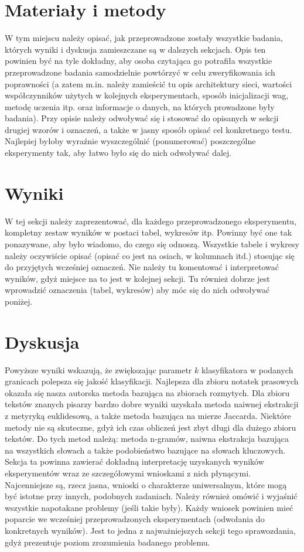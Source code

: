 \documentclass[a4paper]{classrep}
\begin{document}
\section{Materiały i metody}

{\color{blue}
W tym miejscu należy opisać, jak przeprowadzone zostały wszystkie badania,
których wyniki i dyskusja zamieszczane są w dalszych sekcjach. Opis ten
powinien być na tyle dokładny, aby osoba czytająca go potrafiła wszystkie
przeprowadzone badania samodzielnie powtórzyć w celu zweryfikowania ich
poprawności (a zatem m.in. należy zamieścić tu opis architektury sieci,
wartości współczynników użytych w kolejnych eksperymentach, sposób
inicjalizacji wag, metodę uczenia itp. oraz informacje o danych, na których
prowadzone były badania). Przy opisie należy odwoływać się i stosować do
opisanych w sekcji drugiej wzorów i oznaczeń, a także w jasny sposób opisać
cel konkretnego testu. Najlepiej byłoby wyraźnie wyszczególnić (ponumerować)
poszczególne eksperymenty tak, aby łatwo było się do nich odwoływać dalej.}

\section{Wyniki}
{\color{blue}
W tej sekcji należy zaprezentować, dla każdego przeprowadzonego eksperymentu,
kompletny zestaw wyników w postaci tabel, wykresów itp. Powinny być one tak
ponazywane, aby było wiadomo, do czego się odnoszą. Wszystkie tabele i wykresy
należy oczywiście opisać (opisać co jest na osiach, w kolumnach itd.) stosując
się do przyjętych wcześniej oznaczeń. Nie należy tu komentować i interpretować
wyników, gdyż miejsce na to jest w kolejnej sekcji. Tu również dobrze jest
wprowadzić oznaczenia (tabel, wykresów) aby móc się do nich odwoływać
poniżej.}

\section{Dyskusja}
Powyższe wyniki wskazują, że zwiększając parametr \(k\) klasyfikatora w podanych granicach polepsza się jakość klasyfikacji. Najlepsza dla zbioru notatek prasowych 
okazała się nasza autorska metoda bazująca na zbiorach rozmytych. Dla zbioru tekstów znanych pisarzy bardzo dobre wyniki uzyskała metoda naiwnej ekstrakcji z metyryką euklidesową,
a także metoda bazująca na mierze Jaccarda. Niektóre metody nie są skuteczne, gdyż ich czas obliczeń jest zbyt długi dla dużego zbioru tekstów. Do tych metod należą:
metoda n-gramów, naiwna ekstrakcja bazująca na wszystkich słowach a także podobieństwo bazujące na słowach kluczowych. 
{\color{blue}
Sekcja ta powinna zawierać dokładną interpretację uzyskanych wyników
eksperymentów wraz ze szczegółowymi wnioskami z nich płynącymi. Najcenniejsze
są, rzecz jasna, wnioski o charakterze uniwersalnym, które mogą być istotne
przy innych, podobnych zadaniach. Należy również omówić i wyjaśnić wszystkie
napotakane problemy (jeśli takie były). Każdy wniosek powinien mieć poparcie
we wcześniej przeprowadzonych eksperymentach (odwołania do konkretnych
wyników). Jest to jedna z najważniejszych sekcji tego sprawozdania, gdyż
prezentuje poziom zrozumienia badanego problemu.}
\end{document}
